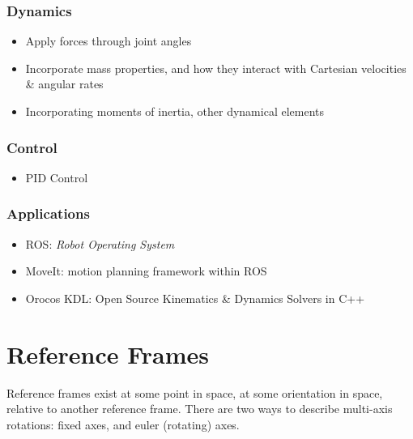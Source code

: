 \documentclass[
  letterpaper,
  DIV=11,
  numbers=noendperiod]{scrreprt}
\providecommand{\tightlist}{%
  \setlength{\itemsep}{0pt}\setlength{\parskip}{0pt}}\usepackage{longtable,booktabs,array}
\begin{document}
\hypertarget{dynamics}{%
\subsection*{Dynamics}\label{dynamics}}

\begin{itemize}
\tightlist
\item
  Apply forces through joint angles
\item
  Incorporate mass properties, and how they interact with Cartesian
  velocities \& angular rates
\item
  Incorporating moments of inertia, other dynamical elements
\end{itemize}

\hypertarget{control}{%
\subsection*{Control}\label{control}}

\begin{itemize}
\tightlist
\item
  PID Control
\end{itemize}

\hypertarget{applications}{%
\subsection*{Applications}\label{applications}}

\begin{itemize}
\tightlist
\item
  ROS: \emph{Robot Operating System}
\item
  MoveIt: motion planning framework within ROS
\item
  Orocos KDL: Open Source Kinematics \& Dynamics Solvers in C++
\end{itemize}


\hypertarget{reference-frames}{%
\chapter{Reference Frames}\label{reference-frames}}

Reference frames exist at some point in space, at some orientation in
space, relative to another reference frame. There are two ways to
describe multi-axis rotations: fixed axes, and euler (rotating) axes.
\end{document}
